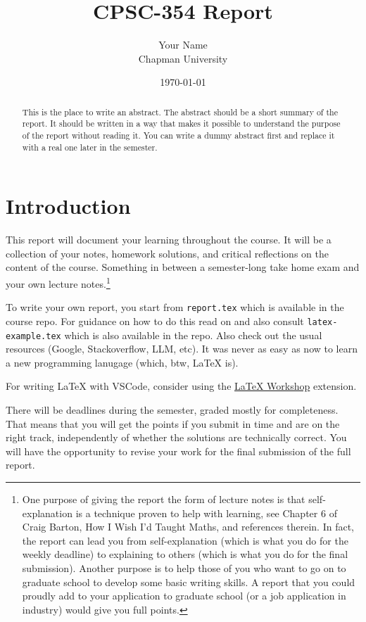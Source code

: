 \documentclass{article}
\title{CPSC-354 Report}
\author{Your Name  \\ Chapman University}
\date{\today}
\theoremstyle{theorem}
\theoremstyle{definition}
\theoremstyle{remark}
\begin{document}
\maketitle

\begin{abstract}
This is the place to write an abstract. The abstract should be a short summary of the report. It should be written in a way that makes it possible to understand the purpose of the report without reading it. You can write a dummy abstract first and replace it with a real one later in the semester.
\end{abstract}

\setcounter{tocdepth}{3}
\tableofcontents

\section{Introduction}\label{intro}

This report will document your learning throughout the course. It will be a collection of your notes, homework solutions, and critical reflections on the content of the course. Something in between a semester-long take home exam and your own lecture notes.\footnote{One purpose of giving the report the form of lecture notes is that self-explanation is a technique proven to help with learning, see Chapter 6 of Craig Barton, How I Wish I'd Taught Maths, and references therein. In fact, the report can lead you from self-explanation (which is what you do for the weekly deadline) to explaining to others (which is what you do for the final submission). Another purpose is to help those of you who want to go on to graduate school to develop some basic writing skills. A report that you could proudly add to your application to graduate school (or a job application in industry) would give you full points.}

To write your own report, you start from \texttt{report.tex} which is available in the course repo. For guidance on how to do this read on and also consult \texttt{latex-example.tex} which is also available in the repo. Also check out the usual resources (Google, Stackoverflow, LLM, etc). It was never as easy as now to learn a new programming lanugage (which, btw, \LaTeX{} is).

For writing \LaTeX{} with VSCode, consider using the \href{https://marketplace.visualstudio.com/items?itemName=James-Yu.latex-workshop}{LaTeX Workshop} extension. 

There will be deadlines during the semester, graded mostly for completeness. That means that you will get the points if you submit in time and are on the right track, independently of whether the solutions are technically correct. You will have the opportunity to revise your work for the final submission of the full report.
\end{document}
